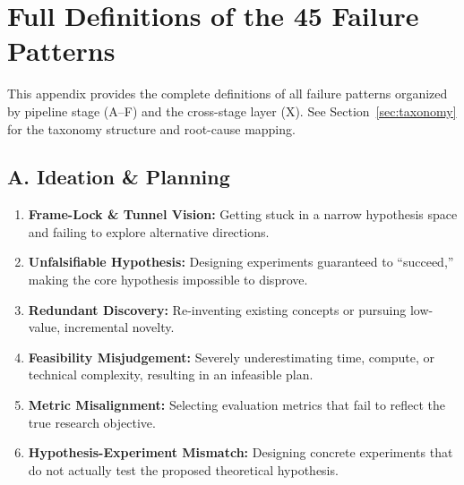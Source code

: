 \section{Full Definitions of the 45 Failure Patterns}
\label{app:failure_pattern_definitions}
 
This appendix provides the complete definitions of all failure patterns organized by pipeline stage (A--F) and the cross-stage layer (X). See Section~\ref{sec:taxonomy} for the taxonomy structure and root-cause mapping.
 
\subsection*{A. Ideation \& Planning}
\begin{enumerate}[label=\textbf{A.\arabic*}, leftmargin=2.8em, labelsep=0.6em, itemsep=3pt, parsep=0pt]
    \item \textbf{Frame-Lock \& Tunnel Vision:} Getting stuck in a narrow hypothesis space and failing to explore alternative directions.
    \item \textbf{Unfalsifiable Hypothesis:} Designing experiments guaranteed to ``succeed,'' making the core hypothesis impossible to disprove.
    \item \textbf{Redundant Discovery:} Re-inventing existing concepts or pursuing low-value, incremental novelty.
    \item \textbf{Feasibility Misjudgement:} Severely underestimating time, compute, or technical complexity, resulting in an infeasible plan.
    \item \textbf{Metric Misalignment:} Selecting evaluation metrics that fail to reflect the true research objective.
    \item \textbf{Hypothesis-Experiment Mismatch:} Designing concrete experiments that do not actually test the proposed theoretical hypothesis.
\end{enumerate}
 
